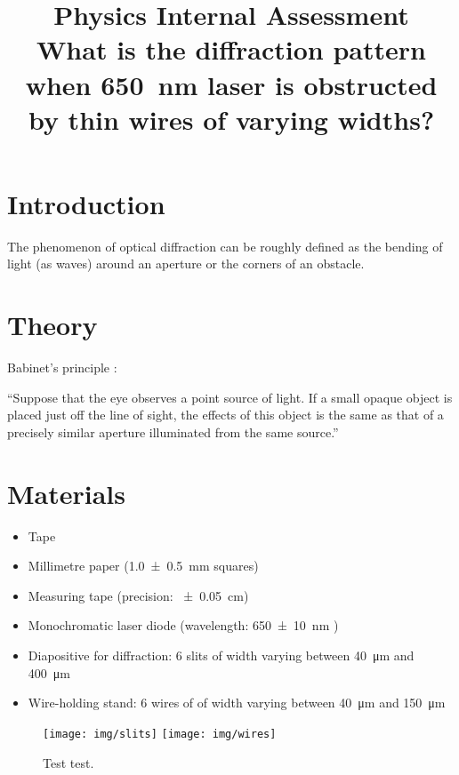 \documentclass[a4paper, 12pt]{article}
\title{
\textbf{Physics Internal Assessment}\\
\bigskip
What is the diffraction pattern when \SI{650}{\nm} laser is obstructed by thin wires of varying widths?
}
\author{}
\date{}
\begin{document}
\maketitle

\section*{Introduction}
The phenomenon of optical diffraction can be roughly defined as the bending of light   (as waves) around an aperture or the corners of an obstacle.

\section*{Theory}

Babinet's principle \cite{babinet}: 
\begin{displayquote}
    ``Suppose that the eye observes a point source of light. If a small opaque object is placed just off the line of sight, the effects of this object is the same as that of a precisely similar aperture illuminated from the same source.''
\end{displayquote}

\newpage

\section*{Materials}
\begin{itemize}
\itemsep 0em
    \item Tape
    \item Millimetre paper (\SI{1.0+-.5}{\mm} squares)
    \item Measuring tape (precision: \SI{+-.05}{\cm})
    \item Monochromatic laser diode (wavelength: \SI{650+-10}{\nm} \cite{laser-specs})
    \item Diapositive for diffraction: 6 slits of width varying between \SI{40}{\um} and \SI{400}{\um}
    \item Wire-holding stand: 6 wires of of width varying between \SI{40}{\um} and \SI{150}{\um} \cite{wires-specs}
\end{itemize}

\begin{figure}[H]
    \centering
        \centering
        \texttt{[image: img/slits]}
    \endminipage\hfill
        \centering
        \texttt{[image: img/wires]}
    \endminipage\hfill
    \caption{Test test. }
    \label{fig:slits-wires}
\end{figure}
\end{document}
